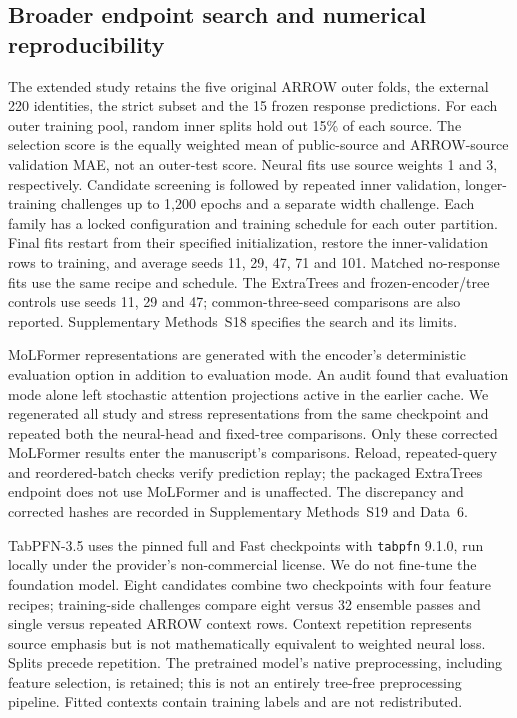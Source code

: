 \subsection*{Broader endpoint search and numerical reproducibility}

The extended study retains the five original ARROW outer folds, the external
220 identities, the strict subset and the 15 frozen response predictions. For each
outer training pool, random inner splits hold out 15\% of each source. The
selection score is the equally weighted mean of public-source and ARROW-source
validation MAE, not an outer-test score. Neural fits use source weights 1 and 3,
respectively. Candidate screening is followed by repeated inner validation,
longer-training challenges up to 1,200 epochs and a separate width challenge.
Each family has a locked configuration and training schedule for each outer
partition. Final fits restart from their specified initialization, restore the
inner-validation rows to training, and average seeds 11, 29, 47, 71 and 101.
Matched no-response fits use the same recipe and schedule. The ExtraTrees and
frozen-encoder/tree controls use seeds 11, 29 and 47; common-three-seed comparisons
are also reported. Supplementary Methods~S18 specifies the search and its limits.

MoLFormer representations are generated with the encoder's deterministic evaluation
option in addition to evaluation mode. An audit found that evaluation mode alone
left stochastic attention projections active in the earlier cache. We regenerated
all study and stress representations from the same checkpoint and repeated both
the neural-head and fixed-tree comparisons. Only these corrected MoLFormer results
enter the manuscript's comparisons. Reload, repeated-query and reordered-batch
checks verify prediction replay; the packaged ExtraTrees endpoint does not
use MoLFormer and is unaffected. The discrepancy and corrected hashes are recorded
in Supplementary Methods~S19 and Data~6.

TabPFN-3.5 uses the pinned full and Fast checkpoints with \texttt{tabpfn} 9.1.0,
run locally under the provider's non-commercial license. We do not fine-tune the
foundation model. Eight candidates combine two checkpoints with four feature
recipes; training-side challenges compare eight versus 32 ensemble passes and
single versus repeated ARROW context rows. Context repetition represents source
emphasis but is not mathematically equivalent to weighted neural loss. Splits
precede repetition. The pretrained model's native preprocessing, including
feature selection, is retained; this is not an entirely tree-free preprocessing
pipeline. Fitted contexts contain training labels and are not redistributed.

